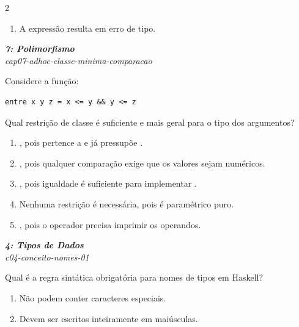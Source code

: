 \documentclass[a4paper,10pt,brazil]{article}
\begin{document}
\begin{multicols}{2}
\begin{enumerate}
  \item A expressão resulta em erro de tipo.


\end{enumerate}

\begin{flushright}
  \footnotesize
  \textit{\textbf{7: Polimorfismo}}\\
  \textit{cap07-adhoc-classe-minima-comparacao}\\

\end{flushright}
Considere a função:

\begin{verbatim}
entre x y z = x <= y && y <= z
\end{verbatim}

Qual restrição de classe é suficiente e mais geral para o tipo dos argumentos?

\begin{enumerate}
  \item {}, pois \haskellinline{(<=)} pertence a  e  já pressupõe .
  \item {}, pois qualquer comparação exige que os valores sejam numéricos.
  \item {}, pois igualdade é suficiente para implementar \haskellinline{(<=)}.
  \item Nenhuma restrição é necessária, pois \haskellinline{(<=)} é paramétrico puro.
  \item {}, pois o operador \haskellinline{(&&)} precisa imprimir os operandos.

\end{enumerate}

\begin{flushright}
  \footnotesize
  \textit{\textbf{4: Tipos de Dados}}\\
  \textit{c04-conceito-nomes-01}\\

\end{flushright}
Qual é a regra sintática obrigatória para nomes de tipos em Haskell?

\begin{enumerate}
  \item Não podem conter caracteres especiais.

  \item Devem ser escritos inteiramente em maiúsculas.


\end{enumerate}
\end{multicols}
\end{document}
